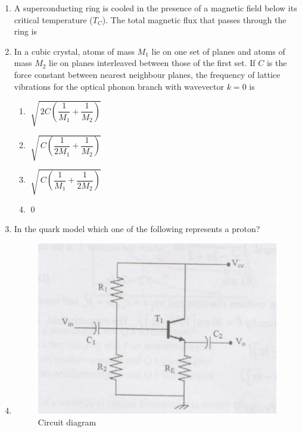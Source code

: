 \documentclass[14pt, a4paper]{extarticle}
\begin{document}
\begin{enumerate}[label=\textbf{Q. \arabic*}]
\item A superconducting ring is cooled in the presence of a magnetic field below its critical temperature ($T_C$). 
The total magnetic flux that passes through the ring is
\begin{enumerate}[label=(\Alph*)]
\end{enumerate}

\item In a cubic crystal, atoms of mass $M_1$ lie on one set of planes and atoms of mass $M_2$ lie on planes interleaved between those of the first set. If $C$ is the force constant between nearest neighbour planes, the frequency of lattice vibrations for the optical phonon branch with wavevector $k=0$ is
\begin{enumerate}[label=(\Alph*)]
\item$\; \sqrt{\,2C \left(\dfrac{1}{M_1} + \dfrac{1}{M_2}\right)}$
\item$\; \sqrt{\,C \left(\dfrac{1}{2M_1} + \dfrac{1}{M_2}\right)}$
\item$\; \sqrt{\,C \left(\dfrac{1}{M_1} + \dfrac{1}{2M_2}\right)}$
\item$\; 0$
\end{enumerate}

\item In the quark model which one of the following represents a proton?
    \begin{enumerate}[label=(\Alph*)]
    \end{enumerate}

\item

\begin{figure}[H]
\centering
\includegraphics[width=0.6\columnwidth]{figs/Q19fig.png}
\caption{Circuit diagram}
\label{fig:q17}
\end{figure}


\end{enumerate}
\end{document}
